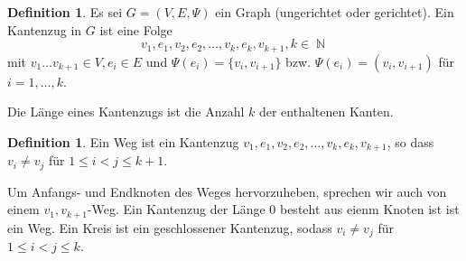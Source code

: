 \documentclass[a4paper,12pt]{article}
\DeclareMathOperator{\N}{\mathbb N}
\theoremstyle{definition}
\newtheorem{definition}[axiom]{Definition}
\begin{document}
	\setcounter{section}{6}
	\setcounter{subsection}{3}
	\begin{definition}
		Es sei $G = (V, E, \Psi)$ ein Graph (ungerichtet oder gerichtet). Ein Kantenzug in $G$ ist eine Folge
		\[
			v_1,e_1,v_2,e_2,\ldots ,v_k,e_k,v_{k+1}, k \in \N
		\]
		mit $v_1\ldots v_{k+1} \in V, e_i \in E$ und $\Psi(e_i) = \{v_i, v_{i+1}\}$ bzw. $\Psi(e_i) = (v_i, v_{i+1})$ für $i = 1, \ldots, k$.
	\end{definition}
	Die Länge eines Kantenzugs ist die Anzahl $k$ der enthaltenen Kanten.
	\begin{definition}
		Ein Weg ist ein Kantenzug $v_1,e_1,v_2,e_2,\ldots ,v_k,e_k,v_{k+1}$, so dass $v_i \neq v_j$ für $1 \leq i < j \leq k+1$.
	\end{definition}
	Um Anfangs- und Endknoten des Weges hervorzuheben, sprechen wir auch von einem $v_1,v_{k+1}$-Weg. Ein Kantenzug der Länge $0$ besteht aus eienm Knoten ist ist ein Weg. Ein Kreis ist ein geschlossener Kantenzug, sodass $v_i \neq v_j$ für $1\leq i < j \leq k$.
\end{document}
